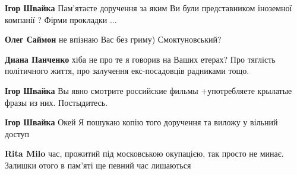 \begin{itemize}
\begin{itemize}
\textbf{Ігор Швайка} Пам'ятаєте доручення за яким Ви були представником іноземної компанії ?
Фірми прокладки ...

 

\textbf{Олег Саймон} не впізнаю Вас без гриму)
Смоктуновський? 🤣🤣🤣🤣😉

 

\textbf{Диана Панченко} хіба не про те я говорив на Ваших етерах?
Про тяглість політичного життя, про залучення екс-посадовців радниками тощо.

 
\textbf{Ігор Швайка} Вы явно смотрите российские фильмы +употребляете крылатые фразы из них. Постыдитесь.

 
\textbf{Ігор Швайка} Окей
Я пошукаю копію того доручення та виложу у вільний доступ
\Laughey[1.0][white]\Laughey[1.0][white]\Laughey[1.0][white]

 

\textbf{Rita Milo} час, прожитий під московською окупацією, так просто не
минає. Залишки отого в пам’яті ще певний час лишаються

 


\end{itemize}
\end{itemize}
